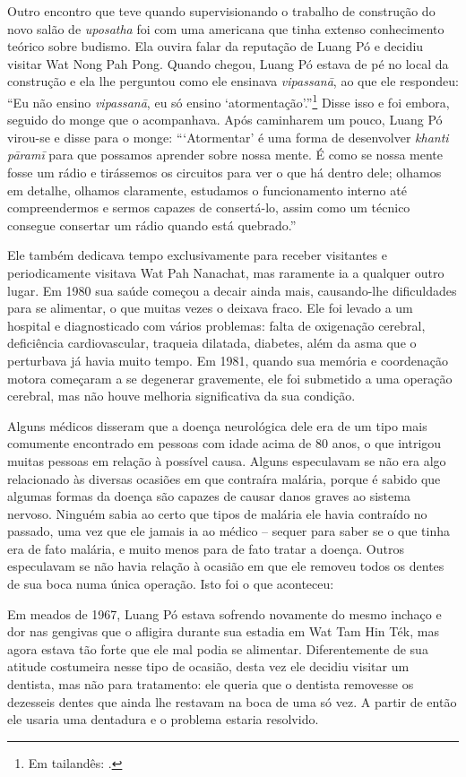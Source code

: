 Outro encontro que teve quando supervisionando o trabalho de construção
do novo salão de \emph{uposatha} foi com uma americana que tinha extenso
conhecimento teórico sobre budismo. Ela ouvira falar da reputação de
Luang Pó e decidiu visitar Wat Nong Pah Pong. Quando chegou, Luang Pó
estava de pé no local da construção e ela lhe perguntou como ele
ensinava \emph{vipassanā}, ao que ele respondeu: ``Eu não ensino
\emph{vipassanā}, eu só ensino `atormentação'.''\footnote{Em tailandês:
  .} Disse isso e foi embora, seguido do monge que o
acompanhava. Após caminharem um pouco, Luang Pó virou-se e disse para o
monge: ```Atormentar' é uma forma de desenvolver \emph{khanti pāramī}
para que possamos aprender sobre nossa mente. É como se nossa mente
fosse um rádio e tirássemos os circuitos para ver o que há dentro dele;
olhamos em detalhe, olhamos claramente, estudamos o funcionamento
interno até compreendermos e sermos capazes de consertá-lo, assim como
um técnico consegue consertar um rádio quando está quebrado.''

Ele também dedicava tempo exclusivamente para receber visitantes e
periodicamente visitava Wat Pah Nanachat, mas raramente ia a qualquer
outro lugar. Em 1980 sua saúde começou a decair ainda mais, causando-lhe
dificuldades para se alimentar, o que muitas vezes o deixava fraco. Ele
foi levado a um hospital e diagnosticado com vários problemas: falta de
oxigenação cerebral, deficiência cardiovascular, traqueia dilatada,
diabetes, além da asma que o perturbava já havia muito tempo. Em 1981,
quando sua memória e coordenação motora começaram a se degenerar
gravemente, ele foi submetido a uma operação cerebral, mas não houve
melhoria significativa da sua condição.

Alguns médicos disseram que a doença neurológica dele era de um tipo
mais comumente encontrado em pessoas com idade acima de 80 anos, o que
intrigou muitas pessoas em relação à possível causa. Alguns especulavam
se não era algo relacionado às diversas ocasiões em que contraíra
malária, porque é sabido que algumas formas da doença são capazes de
causar danos graves ao sistema nervoso. Ninguém sabia ao certo que tipos
de malária ele havia contraído no passado, uma vez que ele jamais ia ao
médico -- sequer para saber se o que tinha era de fato malária, e muito
menos para de fato tratar a doença. Outros especulavam se não havia
relação à ocasião em que ele removeu todos os dentes de sua boca numa
única operação. Isto foi o que aconteceu:

Em meados de 1967, Luang Pó estava sofrendo novamente do mesmo inchaço e
dor nas gengivas que o afligira durante sua estadia em Wat Tam Hin Ték,
mas agora estava tão forte que ele mal podia se alimentar.
Diferentemente de sua atitude costumeira nesse tipo de ocasião, desta
vez ele decidiu visitar um dentista, mas não para tratamento: ele queria
que o dentista removesse os dezesseis dentes que ainda lhe restavam na
boca de uma só vez. A partir de então ele usaria uma dentadura e o
problema estaria resolvido.

